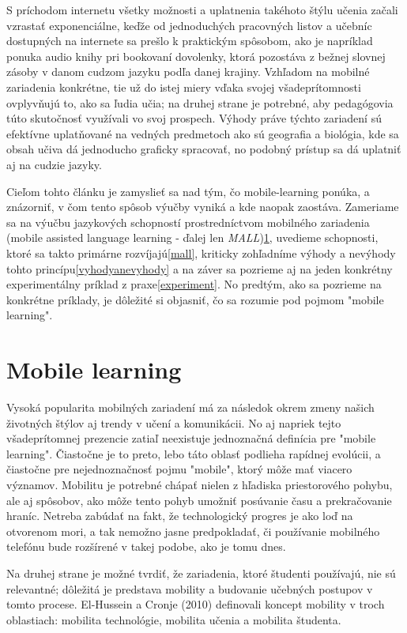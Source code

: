 \documentclass[10pt,oneside,slovak,a4paper]{article}
\begin{document}
S príchodom internetu všetky možnosti a uplatnenia takéhoto štýlu učenia začali vzrastať exponenciálne, keďže od jednoduchých pracovných listov a učebníc dostupných na internete sa prešlo k praktickým spôsobom, ako je napríklad ponuka audio knihy pri bookovaní dovolenky, ktorá pozostáva z bežnej slovnej zásoby v danom cudzom jazyku podľa danej krajiny. Vzhľadom na mobilné zariadenia konkrétne, tie už do istej miery vďaka svojej všadeprítomnosti ovplyvňujú to, ako sa ľudia učia; na druhej strane je potrebné, aby pedagógovia túto skutočnosť využívali vo svoj prospech\cite{KukulskaHulme2009}. Výhody práve týchto zariadení sú efektívne uplatňované na vedných predmetoch ako sú geografia a biológia, kde sa obsah učiva dá jednoducho graficky spracovať, no podobný prístup sa dá uplatniť aj na cudzie jazyky.

Cieľom tohto článku je zamyslieť sa nad tým, čo mobile-learning ponúka, a znázorniť, v čom tento spôsob výučby vyniká a kde naopak zaostáva. Zameriame sa na výučbu jazykových schopností prostredníctvom mobilného zariadenia (mobile assisted language learning - ďalej len \emph{MALL})\ref{ml}, uvedieme schopnosti, ktoré sa takto primárne rozvíjajú\ref{mall}, kriticky zohľadníme výhody a nevýhody tohto princípu\ref{vyhodyanevyhody} a na záver sa pozrieme aj na jeden konkrétny experimentálny príklad z praxe\ref{experiment}. No predtým, ako sa pozrieme na konkrétne príklady, je dôležité si objasniť, čo sa rozumie pod pojmom "mobile learning".


\section{Mobile learning} \label{ml}

Vysoká popularita mobilných zariadení má za následok okrem zmeny našich životných štýlov aj trendy v učení a komunikácii. No aj napriek tejto všadeprítomnej prezencie zatiaľ neexistuje jednoznačná definícia pre "mobile learning"\cite{Kim2012}. Čiastočne je to preto, lebo táto oblasť podlieha rapídnej evolúcii, a čiastočne pre nejednoznačnosť pojmu "mobile", ktorý môže mať viacero významov. Mobilitu je potrebné chápať nielen z hľadiska priestorového pohybu, ale aj spôsobov, ako môže tento pohyb umožniť posúvanie času a prekračovanie hraníc\cite{KukulskaHulme2009}. Netreba zabúdať na fakt, že technologický progres je ako loď na otvorenom mori, a tak nemožno jasne predpokladať, či používanie mobilného telefónu bude rozšírené v takej podobe, ako je tomu dnes. 

Na druhej strane je možné tvrdiť, že zariadenia, ktoré študenti používajú, nie sú relevantné; dôležitá je predstava mobility a budovanie učebných postupov v tomto procese\cite{KukulskaHulme2009}. El-Hussein a Cronje (2010) definovali koncept mobility v troch oblastiach: mobilita technológie, mobilita učenia a mobilita študenta\cite{Kim2012}. 
\end{document}
